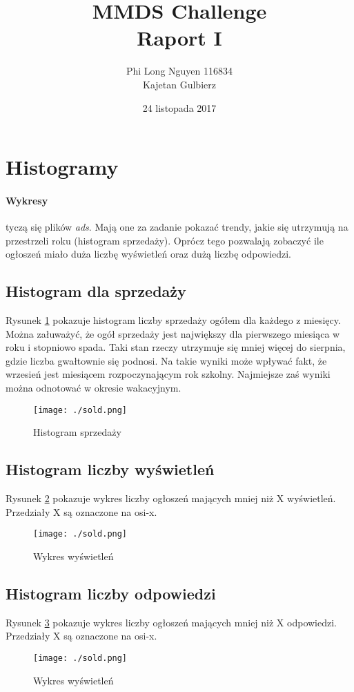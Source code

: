 \documentclass[a4paper,11pt]{article}
\author{Phi Long Nguyen 116834 \\ Kajetan Gulbierz}
\title{MMDS Challenge\\
\large{{\bf Raport I}  }}
\date{24 listopada  2017}
\begin{document}
\maketitle 

\section{Histogramy}
\paragraph{Wykresy} tyczą się plików \textit{ads}. Mają one za zadanie pokazać trendy, jakie się utrzymują na przestrzeli roku (histogram sprzedaży). Oprócz tego pozwalają zobaczyć ile ogłoszeń miało duża liczbę wyświetleń oraz dużą liczbę odpowiedzi.\


\subsection{Histogram dla sprzedaży} 
Rysunek \ref{fig:automat} pokazuje histogram liczby sprzedaży ogółem dla każdego z miesięcy. Można załuważyć, że ogół sprzedaży jest największy dla pierwszego miesiąca w roku i stopniowo spada. Taki stan rzeczy utrzymuje się mniej więcej do sierpnia, gdzie liczba gwałtownie się podnosi. Na takie wyniki może wpływać fakt, że wrzesień jest miesiącem rozpoczynającym rok szkolny. Najmiejsze zaś wyniki można odnotować w okresie wakacyjnym.  

\begin{figure}[H]
	\centering
	\texttt{[image: ./sold.png]}
	\caption{\label{fig:automat}Histogram sprzedaży}
\end{figure}

\subsection{Histogram liczby wyświetleń} 
Rysunek \ref{fig:wyswietlenia} pokazuje wykres liczby ogłoszeń mających mniej niż X wyświetleń. Przedziały X są oznaczone na osi-x.

\begin{figure}[H]
	\centering
	\texttt{[image: ./sold.png]}
	\caption{\label{fig:wyswietlenia}Wykres wyświetleń}
\end{figure}

\subsection{Histogram liczby odpowiedzi} 
Rysunek \ref{fig:odpowiedzi} pokazuje wykres liczby ogłoszeń mających mniej niż X odpowiedzi. Przedziały X są oznaczone na osi-x.

\begin{figure}[H]
	\centering
	\texttt{[image: ./sold.png]}
	\caption{\label{fig:odpowiedzi}Wykres wyświetleń}
\end{figure}
\end{document}
